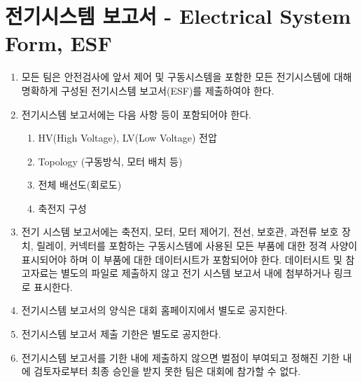 \documentclass[final,a4paper,10pt]{report}
\begin{document}
\section{전기시스템 보고서 - Electrical System Form, ESF}\label{rule:formula-technical.electrical-system-form}
\begin{enumerate}
  \item\label{rule:formula-technical.electrical-system-form.submission-before-safety-inspection} 모든 팀은 안전검사에 앞서 제어 및 구동시스템을 포함한 모든 전기시스템에 대해 명확하게 구성된 전기시스템 보고서(ESF)를 제출하여야 한다.

  \item\label{rule:formula-technical.electrical-system-form.report-contents} 전기시스템 보고서에는 다음 사항 등이 포함되어야 한다.
    \begin{enumerate}
      \item\label{rule:formula-technical.electrical-system-form.report-contents.hv-and-lv-voltage} HV(High Voltage), LV(Low Voltage) 전압
      \item\label{rule:formula-technical.electrical-system-form.report-contents.topology} Topology (구동방식, 모터 배치 등)
      \item\label{rule:formula-technical.electrical-system-form.report-contents.wiring-diagram} 전체 배선도(회로도)
      \item\label{rule:formula-technical.electrical-system-form.report-contents.battery-configuration} 축전지 구성
    \end{enumerate}

  \item\label{rule:formula-technical.electrical-system-form.component-ratings-and-datasheets} 전기 시스템 보고서에는 축전지, 모터, 모터 제어기, 전선, 보호관, 과전류 보호 장치, 릴레이, 커넥터를 포함하는 구동시스템에 사용된 모든 부품에 대한 정격 사양이 표시되어야 하며 이 부품에 대한 데이터시트가 포함되어야 한다. 데이터시트 및 참고자료는 별도의 파일로 제출하지 않고 전기 시스템 보고서 내에 첨부하거나 링크로 표시한다.
  \item\label{rule:formula-technical.electrical-system-form.form-announced-separately} 전기시스템 보고서의 양식은 대회 홈페이지에서 별도로 공지한다.
  \item\label{rule:formula-technical.electrical-system-form.deadline-announced-separately} 전기시스템 보고서 제출 기한은 별도로 공지한다.
  \item\label{rule:formula-technical.electrical-system-form.late-penalty-and-disqualification} 전기시스템 보고서를 기한 내에 제출하지 않으면 벌점이 부여되고 정해진 기한 내에 검토자로부터 최종 승인을 받지 못한 팀은 대회에 참가할 수 없다.
\end{enumerate}
\end{document}
